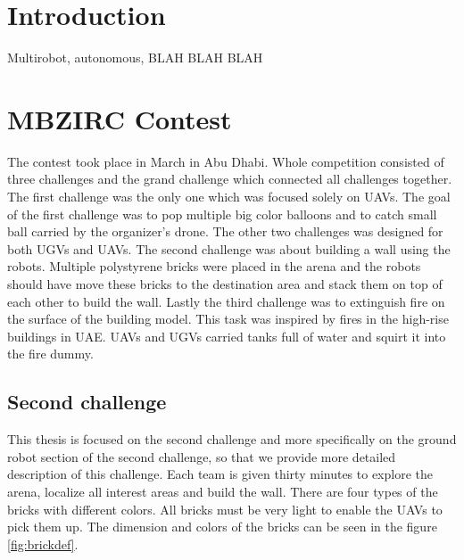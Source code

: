 \section{Introduction}
Multirobot, autonomous, BLAH BLAH BLAH


\section{MBZIRC Contest}
The contest took place in March in Abu Dhabi. Whole competition consisted of three challenges and the grand challenge which connected all challenges together. The first challenge was the only one which was focused solely on UAVs. The goal of the first challenge was to pop multiple big color balloons and to catch small ball carried by the organizer's drone. The other two challenges was designed for both UGVs and UAVs. The second challenge was about building a wall using the robots. Multiple polystyrene bricks were placed in the arena and the robots should have move these bricks to the destination area and stack them on top of each other to build the wall. Lastly the third challenge was to extinguish fire on the surface of the building model. This task was inspired by fires in the high-rise buildings in UAE. UAVs and UGVs carried tanks full of water and squirt it into the fire dummy.

\subsection{Second challenge}
This thesis is focused on the second challenge and more specifically on the ground robot section of the second challenge, so that we provide more detailed description of this challenge. Each team is given thirty minutes to explore the arena, localize all interest areas and build the wall. There are four types of the bricks with different colors. All bricks must be very light to enable the UAVs to pick them up. The dimension and colors of the bricks can be seen in the figure \ref{fig:brickdef}. 

